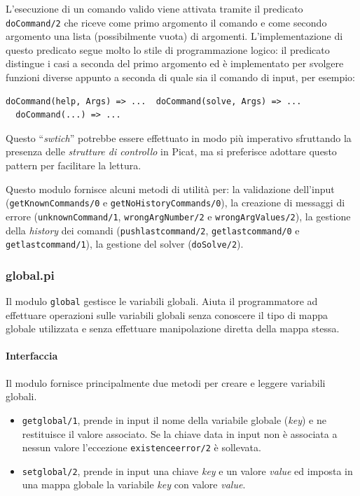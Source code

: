 \documentclass[12pt,a4paper,openright]{book} %
\begin{document}
L'esecuzione di un comando valido viene attivata tramite il predicato
\texttt{doCommand/2} che riceve come primo argomento il comando e come
secondo argomento una lista (possibilmente vuota) di
argomenti. L'implementazione di questo predicato segue molto lo stile
di programmazione logico: il predicato distingue i casi a seconda del
primo argomento ed è implementato per svolgere funzioni diverse
appunto a seconda di quale sia il comando di input, per esempio:
\begin{verbatim}
doCommand(help, Args) => ...  doCommand(solve, Args) => ...
  doCommand(...) => ...
\end{verbatim}
Questo ``\textit{swtich}'' potrebbe essere effettuato in modo più
imperativo sfruttando la presenza delle \textit{strutture di
  controllo} in Picat, ma si preferisce adottare questo pattern per
facilitare la lettura.

Questo modulo fornisce alcuni metodi di utilità per: la validazione
dell'input (\texttt{getKnownCommands/0} e
\texttt{getNoHistoryCommands/0}), la creazione di messaggi di errore
(\texttt{unknownCommand/1}, \texttt{wrongArgNumber/2} e
\texttt{wrongArgValues/2}), la gestione della \textit{history} dei
comandi (\texttt{push\textunderscore last\textunderscore command/2},
\texttt{get\textunderscore last\textunderscore command/0} e
\texttt{get\textunderscore last\textunderscore command/1}), la
gestione del solver (\texttt{doSolve/2}).

\subsubsection{global.pi}

Il modulo \texttt{global} gestisce le variabili globali. Aiuta il
programmatore ad effettuare operazioni sulle variabili globali senza
conoscere il tipo di mappa globale utilizzata e senza effettuare
manipolazione diretta della mappa stessa.

\paragraph{Interfaccia}
Il modulo fornisce principalmente due metodi per creare e leggere
variabili globali.

\begin{itemize}
	\item \texttt{get\textunderscore global/1}, prende in input il
          nome della variabile globale (\emph{key}) e ne restituisce
          il valore associato. Se la chiave data in input non è
          associata a nessun valore l'eccezione
          \texttt{existence\textunderscore error/2} è sollevata.
	\item \texttt{set\textunderscore global/2}, prende in input
          una chiave \emph{key} e un valore \emph{value} ed imposta in
          una mappa globale la variabile \emph{key} con valore
          \emph{value}.
\end{itemize}
\end{document}
